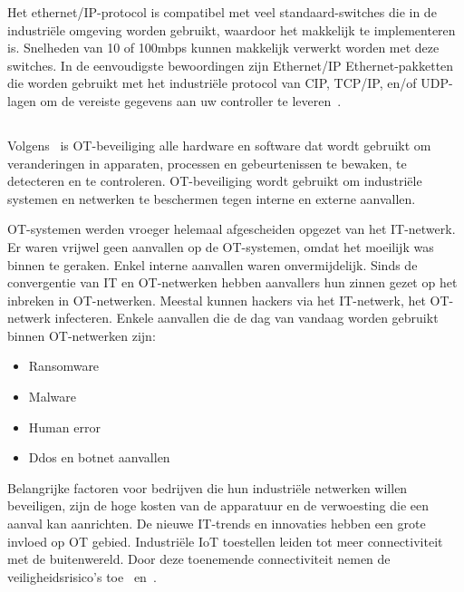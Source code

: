 Het ethernet/IP-protocol is compatibel met veel standaard-switches die in de industriële omgeving worden gebruikt, waardoor het makkelijk te implementeren is. Snelheden van 10 of 100mbps kunnen makkelijk verwerkt worden met deze switches. In de eenvoudigste bewoordingen zijn Ethernet/IP Ethernet-pakketten die worden gebruikt met het industriële protocol van CIP, TCP/IP, en/of UDP-lagen om de vereiste gegevens aan uw controller te leveren~\autocite{Realpars2019a}.

\subsection{}
\label{subsec:OT security}
\subsubsection{}
\label{subsec:Wat valt er onder OT security?}
Volgens~\textcite{Infradata2019} is OT-beveiliging alle hardware en software dat wordt gebruikt om veranderingen in apparaten, processen en gebeurtenissen te bewaken, te detecteren en te controleren. OT-beveiliging wordt gebruikt om industriële systemen en netwerken te beschermen tegen interne en externe aanvallen. 

OT-systemen werden vroeger helemaal afgescheiden opgezet van het IT-netwerk. Er waren vrijwel geen aanvallen op de OT-systemen, omdat het moeilijk was binnen te geraken. Enkel interne aanvallen waren onvermijdelijk. Sinds de convergentie van IT en OT-netwerken hebben aanvallers hun zinnen gezet op het inbreken in OT-netwerken. Meestal kunnen hackers via het IT-netwerk, het OT-netwerk infecteren. Enkele aanvallen die de dag van vandaag worden gebruikt binnen OT-netwerken zijn:
\begin{itemize}
    \item Ransomware
    \item Malware
    \item Human error
    \item Ddos en botnet aanvallen
\end{itemize}
Belangrijke factoren voor bedrijven die hun industriële netwerken willen beveiligen, zijn de hoge kosten van de apparatuur en de verwoesting die een aanval kan aanrichten. De nieuwe IT-trends en innovaties hebben een grote invloed op OT gebied. Industriële IoT toestellen leiden tot meer connectiviteit met de buitenwereld. Door deze toenemende connectiviteit nemen de veiligheidsrisico's toe~\autocite{Infradata2019} en~\autocite{Security2020}.

